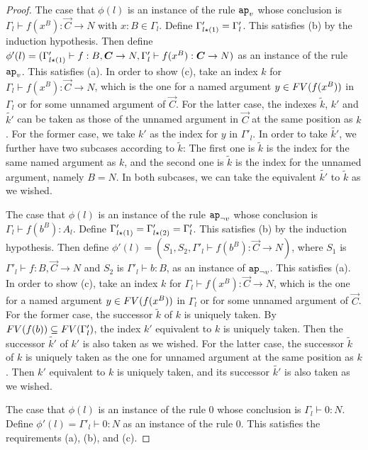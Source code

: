 \begin{proof}
  The case that $\phi(l)$ is an instance of the rule $\apvar$
  whose conclusion is $\Gamma_l\vdash f(x^B):\vec{C}\to N$ with $x:B\in \Gamma_l$.  
  Define $\Gamma'_{l{\star}(1)} = \Gamma'_l$.
  This satisfies (b) by the induction hypothesis. 
  Then define
  $\phi'(l) = (\Gamma'_{l\conc(1)}\vdash f:B,\vec{C}\to N, \Gamma'_l\vdash f(x^B):\vec{C}\to N)$
  as an instance of the rule $\apvar$. This satisfies (a). 
  In order to show (c), 
  take an index $k$ for $\Gamma_l\vdash f(x^B):\vec{C}\to N$, which is the one for
  a named argument $y \in {{\relax FV}}(f(x^B))$ in $\Gamma_l$
  or for some unnamed argument of $\vec{C}$. 
  For the latter case, the indexes $\tilde{k}$, $k'$ and $\tilde{k'}$ can be taken
  as those of the unnamed argument in $\vec{C}$ at the same position as $k$.
  For the former case, we take $k'$ as the index for $y$ in $\Gamma'_l$.
  In order to take $\tilde{k'}$,
  we further have two subcases according to $\tilde{k}$: 
  The first one is $\tilde{k}$ is the index for the same named argument as $k$, 
  and the second one is $\tilde{k}$ is the index for the unnamed argument, namely $B=N$.
  In both subcases, we can take the equivalent $\tilde{k'}$ to $\tilde{k}$ as we wished.
    
  The case that $\phi(l)$ is an instance of the rule $\apnotvar$
  whose conclusion is $\Gamma_l\vdash f(b^B):A_l$. 
  Define $\Gamma'_{l{\star}(1)} = \Gamma'_{l{\star}(2)} = \Gamma'_l$.
  This satisfies (b) by the induction hypothesis.
  Then define $\phi'(l) = (S_1, S_2, \Gamma'_l\vdash f(b^B):\vec{C}\to N)$,
  where $S_1$ is $\Gamma'_{l}\vdash f:B,\vec{C}\to N$
  and $S_2$ is $\Gamma'_{l}\vdash b:B$, as an instance of $\apnotvar$.
  This satisfies (a).
  In order to show (c), 
  take an index $k$ for $\Gamma_l\vdash f(x^B):\vec{C}\to N$, which is the one for
  a named argument $y \in {{\relax FV}}(f(x^B))$ in $\Gamma_l$
  or for some unnamed argument of $\vec{C}$.
  For the former case, the successor $\tilde{k}$ of $k$ is uniquely taken.
  By ${{\relax FV}}(f(b)) \subseteq {{\relax FV}}(\Gamma'_l)$, the index $k'$ equivalent to $k$ is uniquely taken. 
  Then the successor $\tilde{k'}$ of $k'$ is also taken as we wished. 
  For the latter case, the successor $\tilde{k}$ of $k$ is uniquely taken
  as the one for unnamed argument at the same position as $k$. 
  Then $k'$ equivalent to $k$ is uniquely taken, and 
  its successor $\tilde{k'}$ is also taken as we wished. 

  The case that $\phi(l)$ is an instance of the rule $0$
  whose conclusion is $\Gamma_l\vdash 0:N$. 
  Define $\phi'(l) = \Gamma'_l\vdash 0:N$ as an instance of the rule $0$.
  This satisfies the requirements (a), (b), and (c). 


\end{proof}
